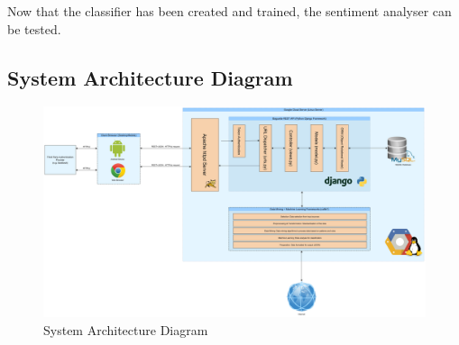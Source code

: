 Now that the classifier has been created and trained, the sentiment analyser can be tested.

\begin{landscape}

\section{System Architecture Diagram}

\begin{figure}
  \centering
  \begin{minipage}{180mm}
    \centering
    \includegraphics[width=180mm]{inc/architecture_diagram.jpg}
    \caption{System Architecture Diagram}
    \label{fig:architecture_diagram}
  \end{minipage}
\end{figure}

\end{landscape}
